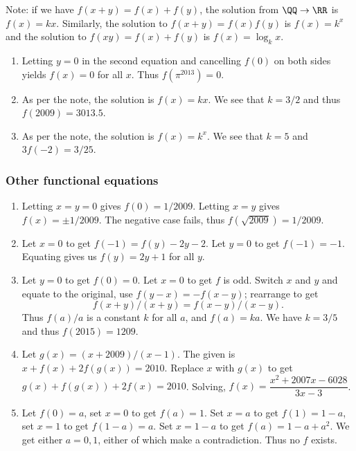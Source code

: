 \documentclass[10pt,paper=letter]{scrartcl}
\begin{document}
Note: if we have $f(x+y) = f(x) + f(y)$, the solution from $\QQ \to \RR$ is $f(x) = kx$. Similarly, the solution to $f(x+y) = f(x)f(y)$ is $f(x) = k^x$ and the solution to $f(xy) = f(x) + f(y)$ is $f(x) = \log_k x$.

\begin{enumerate}

\item Letting $y = 0$ in the second equation and cancelling $f(0)$ on both sides yields $f(x) = 0$ for all $x$. Thus $f(\pi^{2013}) = 0$.

\item As per the note, the solution is $f(x) = kx$. We see that $k = 3/2$ and thus $f(2009) = 3013.5$.

\item As per the note, the solution is $f(x) = k^x$. We see that $k = 5$ and $3f(-2) = 3/25$.

\end{enumerate}

\subsubsection*{Other functional equations}

\begin{enumerate}

\item Letting $x = y = 0$ gives $f(0) = 1/2009$. Letting $x = y$ gives $f(x) = \pm 1/2009$. The negative case fails, thus $f(\sqrt{2009}) = 1/2009$.

\item Let $x = 0$ to get $f(-1) = f(y) - 2y - 2$. Let $y = 0$ to get $f(-1) = -1$. Equating gives us $f(y) = 2y + 1$ for all $y$.

\item Let $y = 0$ to get $f(0) = 0$. Let $x = 0$ to get $f$ is odd. Switch $x$ and $y$ and equate to the original, use $f(y-x) = -f(x-y)$; rearrange to get $$f(x+y)/(x+y) = f(x-y)/(x-y).$$ Thus $f(a)/a$ is a constant $k$ for all $a$, and $f(a) = ka$. We have $k = 3/5$ and thus $f(2015) = 1209$.

\item Let $g(x) = (x+2009)/(x-1)$. The given is $x+f(x)+2f(g(x)) = 2010$. Replace $x$ with $g(x)$ to get $g(x) + f(g(x)) + 2f(x) = 2010$. Solving, $f(x) = \dfrac{x^2 + 2007x - 6028}{3x - 3}$.

\item Let $f(0) = a$, set $x = 0$ to get $f(a) = 1$. Set $x = a$ to get $f(1) = 1-a$, set $x = 1$ to get $f(1 - a) = a$. Set $x = 1-a$ to get $f(a) = 1 - a + a^2$. We get either $a = 0, 1$, either of which make a contradiction. Thus no $f$ exists.

\end{enumerate}
\end{document}
